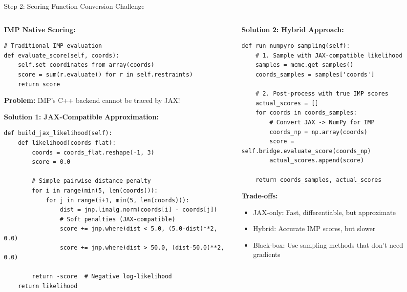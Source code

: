 \documentclass[aspectratio=169]{beamer}
\begin{document}
\begin{frame}[fragile]{Step 2: Scoring Function Conversion Challenge}
\begin{columns}[T]
\begin{column}{0.5\textwidth}
\textbf{IMP Native Scoring:}
\begin{lstlisting}
# Traditional IMP evaluation
def evaluate_score(self, coords):
    self.set_coordinates_from_array(coords)
    score = sum(r.evaluate() for r in self.restraints)
    return score
\end{lstlisting}

\textbf{Problem:} IMP's C++ backend cannot be traced by JAX!

\vspace{0.3cm}
\textbf{Solution 1: JAX-Compatible Approximation:}
\begin{lstlisting}
def build_jax_likelihood(self):
    def likelihood(coords_flat):
        coords = coords_flat.reshape(-1, 3)
        score = 0.0
        
        # Simple pairwise distance penalty
        for i in range(min(5, len(coords))):
            for j in range(i+1, min(5, len(coords))):
                dist = jnp.linalg.norm(coords[i] - coords[j])
                # Soft penalties (JAX-compatible)
                score += jnp.where(dist < 5.0, (5.0-dist)**2, 0.0)
                score += jnp.where(dist > 50.0, (dist-50.0)**2, 0.0)
        
        return -score  # Negative log-likelihood
    return likelihood
\end{lstlisting}
\end{column}

\begin{column}{0.5\textwidth}
\textbf{Solution 2: Hybrid Approach:}
\begin{lstlisting}
def run_numpyro_sampling(self):
    # 1. Sample with JAX-compatible likelihood
    samples = mcmc.get_samples()
    coords_samples = samples['coords']
    
    # 2. Post-process with true IMP scores
    actual_scores = []
    for coords in coords_samples:
        # Convert JAX -> NumPy for IMP
        coords_np = np.array(coords)
        score = self.bridge.evaluate_score(coords_np)
        actual_scores.append(score)
    
    return coords_samples, actual_scores
\end{lstlisting}

\vspace{0.3cm}
\textbf{Trade-offs:}
\begin{itemize}
    \item \alert{JAX-only}: Fast, differentiable, but approximate
    \item \alert{Hybrid}: Accurate IMP scores, but slower
    \item \alert{Black-box}: Use sampling methods that don't need gradients
\end{itemize}
\end{column}
\end{columns}
\end{frame}
\end{document}
